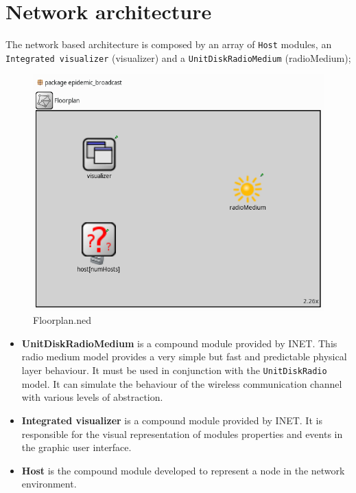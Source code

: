 \section{Network architecture}
The network based architecture is composed by an array of \texttt{Host} modules, an
\texttt{Integrated visualizer} (visualizer) and a \texttt{UnitDiskRadioMedium} (radioMedium);
\begin{figure}[H]
    \begin{center}
        \includegraphics[scale=0.35]{img/floorplan.png}
        \caption{Floorplan.ned}
        \label{fig:floorplanOmnet}
    \end{center}
    \vspace*{-0.8cm}
\end{figure}
\begin{itemize}
    \item \textbf{UnitDiskRadioMedium} is a compound module provided by INET.
    This radio medium model provides a very simple but fast and predictable
    physical layer behaviour. It must be used in conjunction with the
    \texttt{UnitDiskRadio} model. It can simulate the behaviour of the wireless
    communication channel with various levels of abstraction.
    \item \textbf{Integrated visualizer} is a compound module provided by INET.
    It is responsible for the visual representation of modules properties and
    events in the graphic user interface.
    \item \textbf{Host} is the compound module developed to represent a node
    in the network environment.
\end{itemize}
